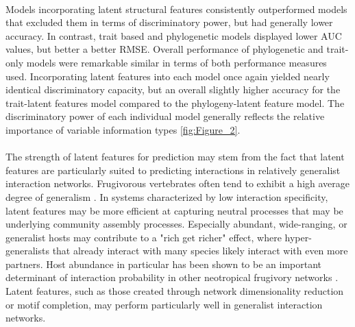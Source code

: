 \documentclass[num-refs]{wiley-article}%
\begin{document}
\paragraph*{}
Models incorporating latent structural features consistently outperformed models that excluded them in terms of discriminatory power, but had generally lower accuracy. In contrast, trait based and phylogenetic models displayed lower AUC values, but better a better RMSE. Overall performance of phylogenetic and trait-only models were remarkable similar in terms of both performance measures used. Incorporating latent features into each model once again yielded nearly identical discriminatory  capacity, but an overall slightly higher accuracy for the trait-latent features model compared to the phylogeny-latent feature model. The discriminatory power of each individual model generally reflects the relative importance of variable information types \ref{fig:Figure_2}. 

\paragraph*{}
The strength of latent features for prediction may stem from the fact that latent features are particularly suited to predicting interactions in relatively generalist interaction networks. Frugivorous vertebrates often tend to exhibit a high average degree of generalism \cite{richardson2000plant}. In systems characterized by low interaction specificity, latent features may be more efficient at capturing neutral processes that may be underlying community assembly processes. Especially abundant, wide-ranging, or generalist hosts may contribute to a "rich get richer" effect, where hyper-generalists that already interact with many species likely interact with even more partners. Host abundance in particular has been shown to be an important determinant of interaction probability in other neotropical frugivory networks \cite{laurindo2020drivers}. Latent features, such as those created through network dimensionality reduction or motif completion, may perform particularly well in generalist interaction networks. 
\end{document}
